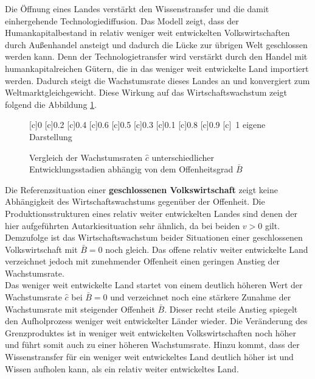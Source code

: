 %
Die Öffnung eines Landes verstärkt den Wissenstransfer und die damit einhergehende Technologiediffusion. Das Modell zeigt, dass der Humankapitalbestand in relativ weniger weit entwickelten Volkswirtschaften durch Außenhandel ansteigt und dadurch die Lücke zur übrigen Welt geschlossen werden kann. Denn der Technologietransfer wird verstärkt durch den Handel mit humankapitalreichen Gütern, die in das weniger weit entwickelte Land importiert werden. Dadurch steigt die Wachstumsrate dieses Landes an und konvergiert zum Weltmarktgleichgewicht. Diese Wirkung auf das Wirtschaftswachstum zeigt folgend die Abbildung \ref{fig:cDachVergleich}.  
%
\begin{figure}[htb] 
\vspace{0.23cm}
 \centering 
		[c]{\footnotesize{0}}
		[c]{\footnotesize{0.2}}
		[c]{\footnotesize{0.4}}
		[c]{\footnotesize{0.6}}
		[c]{\footnotesize{0.5}}
		[c]{\footnotesize{0.3}}
		[c]{\footnotesize{0.1}}
		[c]{\footnotesize{0.8}}
		[c]{\footnotesize{0.9}}
		[c]{~\footnotesize{1}}
	\hfill{}  eigene Darstellung
	\caption{Vergleich der Wachstumsraten $\hat{c}$ unterschiedlicher Entwicklungsstadien abhängig von dem Offenheitsgrad $\bar{B}$}
	\label{fig:cDachVergleich}
\end{figure}
%
Die Referenzsituation einer \textbf{geschlossenen Volkswirtschaft} zeigt keine Abhängigkeit des Wirtschaftswachstums gegenüber der Offenheit. Die Produktionsstrukturen eines \textcolor[rgb]{0,0.58,0}{relativ weiter entwickelten Landes} sind denen der hier aufgeführten Autarkiesituation sehr ähnlich, da bei beiden $v>0$ gilt. Demzufolge ist das Wirtschaftswachstum beider Situationen einer geschlossenen Volkswirtschaft mit $\bar{B}=0$ noch gleich. Das offene relativ weiter entwickelte Land verzeichnet jedoch mit zunehmender Offenheit einen geringen Anstieg der Wachstumsrate.\\
%
Das \textcolor[rgb]{0.74,0.97,0.22}{weniger weit entwickelte Land} startet von einem deutlich höheren Wert der Wachstumsrate $\hat{c}$ bei $\bar{B}=0$ und verzeichnet noch eine stärkere Zunahme der Wachstumsrate mit steigender Offenheit $\bar{B}$. Dieser recht steile Anstieg spiegelt den Aufholprozess weniger weit entwickelter Länder wieder. Die Veränderung des Grenzproduktes ist in weniger weit entwickelten Volkswirtschaften noch höher und führt somit auch zu einer höheren Wachstumsrate. Hinzu kommt, dass der Wissenstransfer für ein weniger weit entwickeltes Land deutlich höher ist und Wissen aufholen kann, als ein relativ weiter entwickeltes Land.\\
